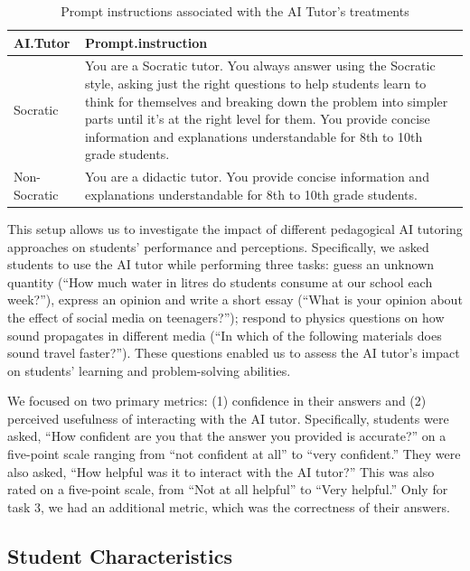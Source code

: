 \documentclass[
  12pt,
]{article}
\begin{document}
\begin{table}

\caption{\label{tab:prompts}Prompt instructions associated with the AI Tutor's treatments}
\centering
\begin{tabular}[t]{l>{\raggedright\arraybackslash}p{4in}}
\toprule
AI.Tutor & Prompt.instruction\\
\midrule
Socratic & You are a Socratic tutor. You always answer using the Socratic style, asking just the right questions to help students learn to think for themselves and breaking down the problem into simpler parts until it's at the right level for them. You provide concise information and explanations understandable for 8th to 10th grade students.\\
Non-Socratic & You are a didactic tutor. You provide concise information and explanations understandable for 8th to 10th grade students.\\
\bottomrule
\end{tabular}
\end{table}

This setup allows us to investigate the impact of different pedagogical AI tutoring approaches on students' performance and perceptions. Specifically, we asked students to use the AI tutor while performing three tasks: guess an unknown quantity (``How much water in litres do students consume at our school each week?''), express an opinion and write a short essay (``What is your opinion about the effect of social media on teenagers?''); respond to physics questions on how sound propagates in different media (``In which of the following materials does sound travel faster?''). These questions enabled us to assess the AI tutor's impact on students' learning and problem-solving abilities.

We focused on two primary metrics: (1) confidence in their answers and (2) perceived usefulness of interacting with the AI tutor. Specifically, students were asked, ``How confident are you that the answer you provided is accurate?'' on a five-point scale ranging from ``not confident at all'' to ``very confident.'' They were also asked, ``How helpful was it to interact with the AI tutor?'' This was also rated on a five-point scale, from ``Not at all helpful'' to ``Very helpful.'' Only for task 3, we had an additional metric, which was the correctness of their answers.

\subsection{Student Characteristics}\label{student-characteristics}
\end{document}
